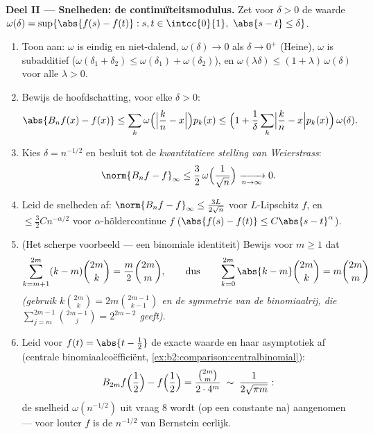 \begin{problem}
\medskip
\noindent\textbf{Deel II --- Snelheden: de continuïteitsmodulus.}
Zet voor $\delta > 0$ de waarde $\omega(\delta) = \sup\{\abs{f(s) -
f(t)} : s, t \in \intcc{0}{1},\ \abs{s - t} \leq \delta\}$.
\begin{enumerate}[resume]
  \item Toon aan: $\omega$ is eindig en niet-dalend,
        $\omega(\delta) \to 0$ als $\delta \to 0^+$ (Heine),
        $\omega$ is subadditief ($\omega(\delta_1 + \delta_2) \leq
        \omega(\delta_1) + \omega(\delta_2)$), en
        $\omega(\lambda\delta) \leq (1 + \lambda)\,\omega(\delta)$
        voor alle $\lambda > 0$.
  \item Bewijs de hoofdschatting, voor elke $\delta > 0$:
        \[
        \abs{B_nf(x) - f(x)}
        \leq \sum_k \omega\Bigl(\Bigl|\frac kn -
        x\Bigr|\Bigr)p_k(x)
        \leq \Bigl(1 + \frac1\delta\sum_k\Bigl|\frac kn -
        x\Bigr|p_k(x)\Bigr)\,\omega(\delta) .
        \]
  \item Kies $\delta = n^{-1/2}$ en besluit tot de
        \emph{kwantitatieve stelling van Weierstrass}:
        \[
        \norm{B_nf - f}_\infty \leq
        \frac32\,\omega\Bigl(\frac{1}{\sqrt n}\Bigr)
        \xrightarrow[n\to\infty]{} 0 .
        \]
  \item Leid de snelheden af: $\norm{B_nf - f}_\infty \leq
        \frac{3L}{2\sqrt n}$ voor $L$-Lipschitz $f$, en $\leq
        \frac32 C n^{-\alpha/2}$ voor $\alpha$-höldercontinue $f$
        ($\abs{f(s) - f(t)} \leq C\abs{s-t}^\alpha$).
  \item (Het scherpe voorbeeld --- een binomiale identiteit) Bewijs
        voor $m \geq 1$ dat
        \[
        \sum_{k=m+1}^{2m} (k - m)\binom{2m}{k}
        = \frac{m}{2}\binom{2m}{m},
        \qquad\text{dus}\qquad
        \sum_{k=0}^{2m}\abs{k - m}\binom{2m}{k}
        = m\binom{2m}{m}
        \]
        \emph{(gebruik $k\binom{2m}k = 2m\binom{2m-1}{k-1}$ en de
        symmetrie van de binomiaalrij, die $\sum_{j=m}^{2m-1}
        \binom{2m-1}{j} = 2^{2m-2}$ geeft)}.
  \item Leid voor $f(t) = \abs{t - \frac12}$ de exacte waarde en
        haar asymptotiek af (centrale binomiaalcoëfficiënt,
        \cref{ex:b2:comparison:centralbinomial}):
        \[
        B_{2m}f\Bigl(\frac12\Bigr) - f\Bigl(\frac12\Bigr)
        = \frac{\binom{2m}{m}}{2\cdot4^{m}}
        \;\sim\; \frac{1}{2\sqrt{\pi m}} :
        \]
        de snelheid $\omega(n^{-1/2})$ uit vraag 8 wordt (op een
        constante na) aangenomen --- voor louter  $f$ is
        de $n^{-1/2}$ van Bernstein eerlijk.
\end{enumerate}


\end{problem}
